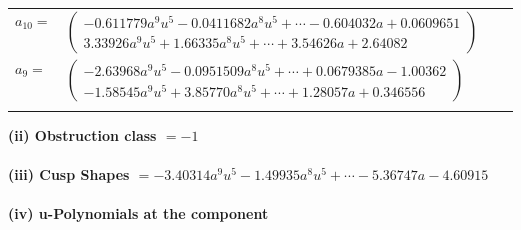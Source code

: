 \documentclass[1p]{elsarticle_modified}
\theoremstyle{definition}
\begin{document}
\begin{tabular}{m{7pt} m{180pt} m{7pt} m{180pt} }
\flushright $a_{10}=$&$\begin{pmatrix}-0.611779 a^{9} u^{5}-0.0411682 a^{8} u^{5}+\cdots-0.604032 a+0.0609651\\3.33926 a^{9} u^{5}+1.66335 a^{8} u^{5}+\cdots+3.54626 a+2.64082\end{pmatrix}$ \\
\flushright $a_{9}=$&$\begin{pmatrix}-2.63968 a^{9} u^{5}-0.0951509 a^{8} u^{5}+\cdots+0.0679385 a-1.00362\\-1.58545 a^{9} u^{5}+3.85770 a^{8} u^{5}+\cdots+1.28057 a+0.346556\end{pmatrix}$\\&\end{tabular}
\flushleft \textbf{(ii) Obstruction class $= -1$}\\~\\
\flushleft \textbf{(iii) Cusp Shapes $= -3.40314 a^{9} u^{5}-1.49935 a^{8} u^{5}+\cdots-5.36747 a-4.60915$}\\~\\
\newpage\renewcommand{\arraystretch}{1}
\flushleft \textbf{(iv) u-Polynomials at the component}\newline \\
\end{document}
